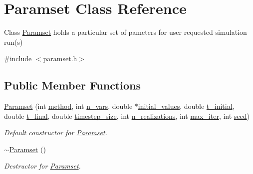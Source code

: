 \hypertarget{class_paramset}{}\section{Paramset Class Reference}
\label{class_paramset}


Class \hyperlink{class_paramset}{Paramset} holds a particular set of pameters for user requested simulation run(s)  




{\ttfamily \#include $<$paramset.\+h$>$}

\subsection*{Public Member Functions}
\begin{DoxyCompactItemize}
\item 
\hyperlink{class_paramset_aa62d7992b29e74983af7d6026b7111c0}{Paramset} (int \hyperlink{class_paramset_a67376577973f825ba60fc7c319ccc906}{method}, int \hyperlink{class_paramset_aee56c5dcf7d40836397965cdcf392343}{n\+\_\+vars}, double $\ast$\hyperlink{class_paramset_aae7232620d4a9c0bbf30b12c37610c1e}{initial\+\_\+values}, double \hyperlink{class_paramset_a7d82a76c08567e5072aa1b125708c7d8}{t\+\_\+initial}, double \hyperlink{class_paramset_ac88cde461d8dbbd8a7d2636fc45f7119}{t\+\_\+final}, double \hyperlink{class_paramset_a0554913cf803a67bc59ffdee154abc24}{timestep\+\_\+size}, int \hyperlink{class_paramset_a50c0325e75983b66d0825406ec7873ac}{n\+\_\+realizations}, int \hyperlink{class_paramset_afeb86c327cd6966707996019609e6ed1}{max\+\_\+iter}, int \hyperlink{class_paramset_ab8a5866bb87cc2d78a69c47bacaeb06e}{seed})
\begin{DoxyCompactList}\small\item\em Default constructor for \hyperlink{class_paramset}{Paramset}. \end{DoxyCompactList}\item 
\hyperlink{class_paramset_af05c1383de964a28d93e0630d2f4670e}{$\sim$\+Paramset} ()
\begin{DoxyCompactList}\small\item\em Destructor for \hyperlink{class_paramset}{Paramset}. \end{DoxyCompactList}\end{DoxyCompactItemize}
